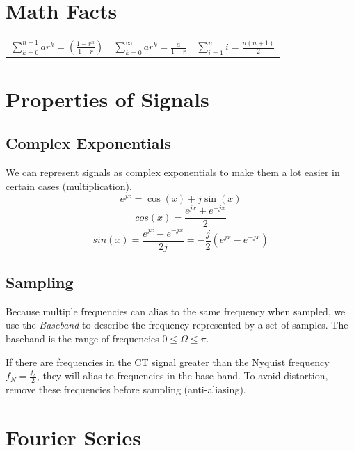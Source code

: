 \documentclass{article}
\begin{document}
\section{Math Facts}
\begin{tabularx}{\textwidth}{YYY}
	$\displaystyle \sum_{k=0}^{n-1} ar^k = \left(\frac{1-r^n}{1-r}\right)$ & 
	$\displaystyle \sum_{k=0}^{\infty} ar^k = \frac{a}{1-r}$ &
	$\displaystyle \sum_{i=1}^{n} i = \frac{n(n+1)}{2}$

\end{tabularx}
\section{Properties of Signals}
\begin{multicols}{2}
\subsection{Complex Exponentials}
We can represent signals as complex exponentials to make them a lot easier in certain cases (multiplication). 
\[ e^{jx} = \cos(x) + j\sin(x) \]
\[ cos(x) = \frac{e^{jx} + e^{-jx}}{2} \]
\[ sin(x) = \frac{e^{jx} - e^{-jx}}{2j} = -\frac{j}{2}\left(e^{jx}-e^{-jx}\right) \]
\subsection{Sampling}
Because multiple frequencies can alias to the same frequency when sampled, we use the \textit{Baseband} to describe the frequency represented by a set of samples. The baseband is the range of frequencies $0 \leq \Omega \leq \pi$.

If there are frequencies in the CT signal greater than the Nyquist frequency $f_N = \frac{f_s}{2}$, they will alias to frequencies in the base band. To avoid distortion, remove these frequencies before sampling (anti-aliasing).
\end{multicols}


\section{Fourier Series}
\end{document}
